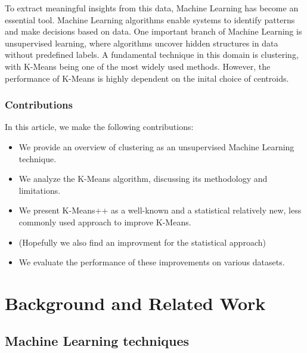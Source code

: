 \documentclass[10pt,twocolumn,letterpaper]{article}
\begin{document}
To extract meaningful insights from this data, Machine Learning has become an
essential tool. Machine Learning algorithms enable systems to identify patterns
and make decisions based on data. One important branch of Machine Learning is
unsupervised learning, where algorithms uncover hidden structures in data
without predefined labels. A fundamental technique in this domain is
clustering, with K-Means being one of the most widely used methods. However,
the performance of K-Means is highly dependent on the inital choice of
centroids.

\subsubsection{Contributions}

In this article, we make the following contributions:

\begin{itemize}
    \item We provide an overview of clustering as an unsupervised Machine Learning
          technique.
    \item We analyze the K-Means algorithm, discussing its methodology and limitations.
    \item We present K-Means++ as a well-known and a statistical relatively new, less
          commonly used approach to improve K-Means.
    \item (Hopefully we also find an improvment for the statistical approach)
    \item We evaluate the performance of these improvements on various datasets.
\end{itemize}


\section{Background and Related Work}\label{sec:background-and-related-work}


\subsection{Machine Learning techniques}\label{subsec:machine-learning-techniques}
\end{document}
